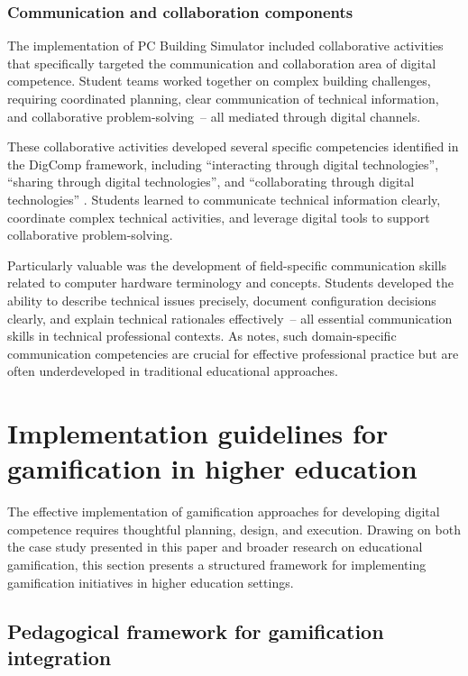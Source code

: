 \documentclass[cte]{acnsart}
\begin{document}
\subsubsection{Communication and collaboration components}

The implementation of PC Building Simulator included collaborative activities that specifically targeted the communication and collaboration area of digital competence. Student teams worked together on complex building challenges, requiring coordinated planning, clear communication of technical information, and collaborative problem-solving~-- all mediated through digital channels.

These collaborative activities developed several specific competencies identified in the DigComp framework, including ``interacting through digital technologies'', ``sharing through digital technologies'', and ``collaborating through digital technologies'' \cite{Vuorikari2016}. Students learned to communicate technical information clearly, coordinate complex technical activities, and leverage digital tools to support collaborative problem-solving.

Particularly valuable was the development of field-specific communication skills related to computer hardware terminology and concepts. Students developed the ability to describe technical issues precisely, document configuration decisions clearly, and explain technical rationales effectively~-- all essential communication skills in technical professional contexts. As \citet{Christiansson200593} notes, such domain-specific communication competencies are crucial for effective professional practice but are often underdeveloped in traditional educational approaches.

\section{Implementation guidelines for gamification in higher education\label{sec5}}

The effective implementation of gamification approaches for developing digital competence requires thoughtful planning, design, and execution. Drawing on both the case study presented in this paper and broader research on educational gamification, this section presents a structured framework for implementing gamification initiatives in higher education settings.

\subsection{Pedagogical framework for gamification integration}
\end{document}
